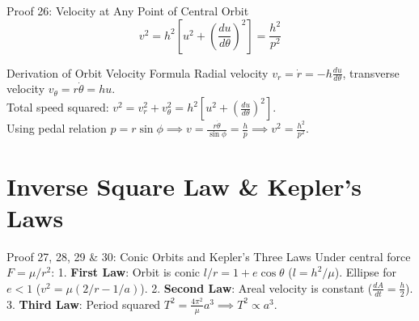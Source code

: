 \documentclass[11pt, a4paper]{report}
\begin{document}
\begin{theorembox}{Proof 26: Velocity at Any Point of Central Orbit}
\begin{equation}
v^2 = h^2 \left[ u^2 + \left(\frac{du}{d\theta}\right)^2 \right] = \frac{h^2}{p^2}
\end{equation}
\end{theorembox}

\begin{proofbox}{Derivation of Orbit Velocity Formula}
Radial velocity $v_r = \dot{r} = -h \frac{du}{d\theta}$, transverse velocity $v_\theta = r\dot{\theta} = h u$.\\
Total speed squared: $v^2 = v_r^2 + v_\theta^2 = h^2 \left[ u^2 + \left(\frac{du}{d\theta}\right)^2 \right]$.\\
Using pedal relation $p = r\sin\phi \implies v = \frac{r\dot{\theta}}{\sin\phi} = \frac{h}{p} \implies v^2 = \frac{h^2}{p^2}$.
\end{proofbox}

\section{Inverse Square Law \& Kepler's Laws}

\begin{theorembox}{Proof 27, 28, 29 \& 30: Conic Orbits and Kepler's Three Laws}
Under central force $F = \mu/r^2$:
1. \textbf{First Law}: Orbit is conic $l/r = 1 + e\cos\theta$ ($l = h^2/\mu$). Ellipse for $e<1$ ($v^2 = \mu(2/r - 1/a)$).
2. \textbf{Second Law}: Areal velocity is constant ($\frac{dA}{dt} = \frac{h}{2}$).
3. \textbf{Third Law}: Period squared $T^2 = \frac{4\pi^2}{\mu} a^3 \implies T^2 \propto a^3$.
\end{theorembox}
\end{document}
